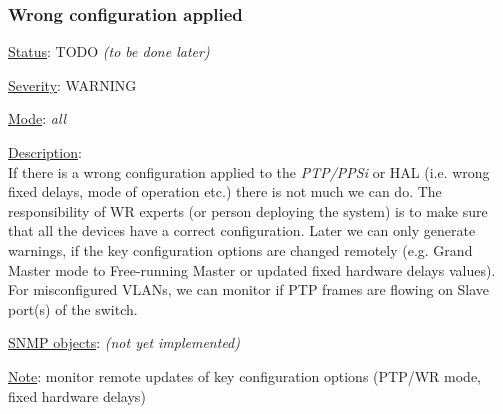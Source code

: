 \subsubsection{\bf Wrong configuration applied}
		\label{fail:timing:wrong_config}
		\begin{packed_enum}
			\item [] \underline{Status}: TODO \emph{(to be done later)}
			\item [] \underline{Severity}: WARNING
			\item [] \underline{Mode}: \emph{all}
			\item [] \underline{Description}:\\
				If there is a wrong configuration applied to the \emph{PTP/PPSi} or HAL
				(i.e.  wrong fixed delays, mode of operation etc.) there is not much we
				can do. The responsibility of WR experts (or person deploying the
				system) is to make sure that all the devices have a correct
				configuration. Later we can only generate warnings, if the key
				configuration options are changed remotely (e.g. Grand Master mode to
				Free-running Master or updated fixed hardware delays values).\\
				For misconfigured VLANs, we can monitor if PTP frames are flowing on
				Slave port(s) of the switch.
			\item [] \underline{SNMP objects}: \emph{(not yet implemented)}
			\item [] \underline{Note}: monitor remote updates of key configuration
				options (PTP/WR mode, fixed hardware delays)
		\end{packed_enum}


